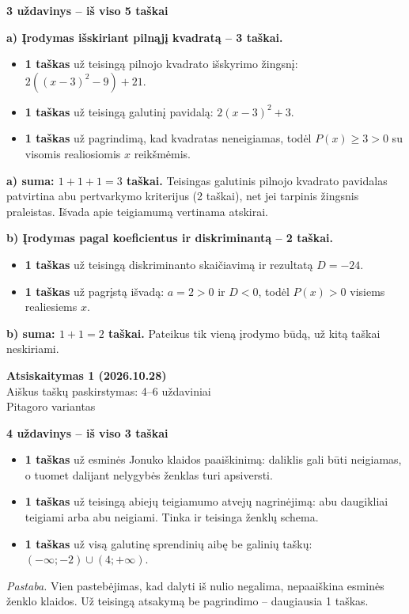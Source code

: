 \documentclass[11pt]{article}
\newcommand{\antraste}[1]{\begin{center}\Large\textbf{Atsiskaitymas 1 (2026.10.28)}\\\large #1\\\normalsize Pitagoro variantas\end{center}}
\newcommand{\sk}[1]{\par\medskip\textbf{#1}\par}
\begin{document}
\begin{center}\end{center}
\sk{3 uždavinys -- iš viso 5 taškai}
\textbf{a) Įrodymas išskiriant pilnąjį kvadratą -- 3 taškai.}
\begin{itemize}
\item \textbf{1 taškas} už teisingą pilnojo kvadrato išskyrimo žingsnį:
$2((x-3)^2-9)+21$.
\item \textbf{1 taškas} už teisingą galutinį pavidalą:
$2(x-3)^2+3$.
\item \textbf{1 taškas} už pagrindimą, kad kvadratas neneigiamas, todėl
$P(x)\ge3>0$ su visomis realiosiomis $x$ reikšmėmis.
\end{itemize}
\textbf{a) suma: $1+1+1=3$ taškai.} Teisingas galutinis pilnojo kvadrato pavidalas patvirtina abu pertvarkymo kriterijus (2 taškai), net jei tarpinis žingsnis praleistas. Išvada apie teigiamumą vertinama atskirai.

\textbf{b) Įrodymas pagal koeficientus ir diskriminantą -- 2 taškai.}
\begin{itemize}
\item \textbf{1 taškas} už teisingą diskriminanto skaičiavimą ir rezultatą $D=-24$.
\item \textbf{1 taškas} už pagrįstą išvadą: $a=2>0$ ir $D<0$, todėl $P(x)>0$ visiems realiesiems $x$.
\end{itemize}
\textbf{b) suma: $1+1=2$ taškai.} Pateikus tik vieną įrodymo būdą, už kitą taškai neskiriami.

\begin{center}\end{center}
\newpage
\antraste{Aiškus taškų paskirstymas: 4--6 uždaviniai}
\sk{4 uždavinys -- iš viso 3 taškai}
\begin{itemize}
\item \textbf{1 taškas} už esminės Jonuko klaidos paaiškinimą: daliklis gali būti neigiamas, o tuomet dalijant nelygybės ženklas turi apsiversti.
\item \textbf{1 taškas} už teisingą abiejų teigiamumo atvejų nagrinėjimą: abu daugikliai teigiami arba abu neigiami. Tinka ir teisinga ženklų schema.
\item \textbf{1 taškas} už visą galutinę sprendinių aibę be galinių taškų:
$(-\infty;-2)\cup(4;+\infty)$.
\end{itemize}
\textit{Pastaba.} Vien pastebėjimas, kad dalyti iš nulio negalima, nepaaiškina esminės ženklo klaidos. Už teisingą atsakymą be pagrindimo -- daugiausia 1 taškas.
\begin{center}\end{center}
\end{document}
